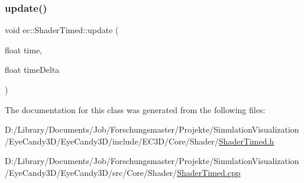 \subsubsection{\texorpdfstring{update()}{update()}}
{\footnotesize\ttfamily void ec\+::\+Shader\+Timed\+::update (\begin{DoxyParamCaption}\item[{float}]{time,  }\item[{float}]{time\+Delta }\end{DoxyParamCaption})\hspace{0.3cm}{\ttfamily [virtual]}}



The documentation for this class was generated from the following files\+:\begin{DoxyCompactItemize}
\item 
D\+:/\+Library/\+Documents/\+Job/\+Forschungsmaster/\+Projekte/\+Simulation\+Visualization/\+Eye\+Candy3\+D/\+Eye\+Candy3\+D/include/\+E\+C3\+D/\+Core/\+Shader/\mbox{\hyperlink{_shader_timed_8h}{Shader\+Timed.\+h}}\item 
D\+:/\+Library/\+Documents/\+Job/\+Forschungsmaster/\+Projekte/\+Simulation\+Visualization/\+Eye\+Candy3\+D/\+Eye\+Candy3\+D/src/\+Core/\+Shader/\mbox{\hyperlink{_shader_timed_8cpp}{Shader\+Timed.\+cpp}}\end{DoxyCompactItemize}
